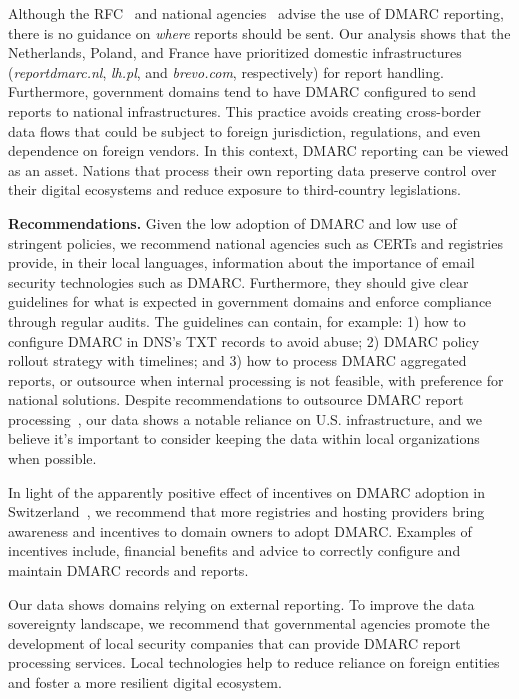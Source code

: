 Although the RFC~\cite{rfc7489} and national agencies~\cite{_BSITR03182Email_} advise the use of \gls{DMARC} reporting, there is no guidance on \textit{where} reports should be sent. Our analysis shows that the Netherlands, Poland, and France have prioritized domestic infrastructures (\textit{reportdmarc.nl}, \textit{lh.pl}, and \textit{brevo.com}, respectively) for report handling. Furthermore, government domains tend to have \gls{DMARC} configured to send reports to national infrastructures. This practice avoids creating cross-border data flows that could be subject to foreign jurisdiction, regulations, and even dependence on foreign vendors. In this context, \gls{DMARC} reporting can be viewed as an asset. Nations that process their own reporting data preserve control over their digital ecosystems and reduce exposure to third-country legislations.

\textbf{Recommendations.}
Given the low adoption of \gls{DMARC} and low use of stringent policies, we recommend national agencies such as CERTs and registries provide, in their local languages, information about the importance of email security technologies such as \gls{DMARC}. Furthermore, they should give clear guidelines for what is expected in government domains and enforce compliance through regular audits. The guidelines can contain, for example: 1) how to configure \gls{DMARC} in DNS's TXT records to avoid abuse; 2) \gls{DMARC} policy rollout strategy with timelines; and 3) how to process \gls{DMARC} aggregated reports, or outsource when internal processing is not feasible, with preference for national solutions. Despite recommendations to outsource \gls{DMARC} report processing~\cite{_DMARCReportsGoogle_}, our data shows a notable reliance on U.S. infrastructure, and we believe it's important to consider keeping the data within local organizations when possible.

In light of the apparently positive effect of incentives on \gls{DMARC} adoption in Switzerland~\cite{_Report2023Ch_}, we recommend that more registries and hosting providers bring awareness and incentives to domain owners to adopt \gls{DMARC}. Examples of incentives include, \eg financial benefits and advice to correctly configure and maintain \gls{DMARC} records and reports.


Our data shows domains relying on external reporting. To improve the data sovereignty landscape, we recommend that governmental agencies promote the development of local security companies that can provide \gls{DMARC} report processing services. Local technologies help to reduce reliance on foreign entities and foster a more resilient digital ecosystem.
